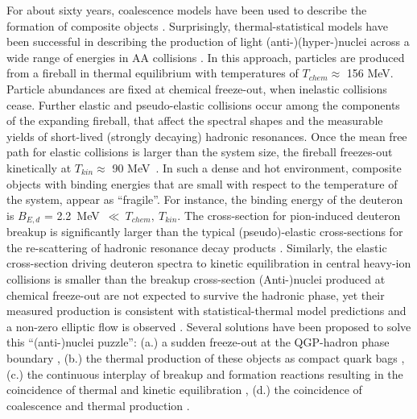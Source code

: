 \documentclass[%
 reprint,
 amsmath,amssymb,
 aps,
]{revtex4-1}
\begin{document}
For about sixty years, coalescence models have been used to describe the formation of composite objects \cite{Butler:1963, Kapusta:1980, Sato:1981ez, Nagle:1996vp, Scheibl:1998tk, Cho:2017dcy, Blum:2017qnn, Bazak:2018hgl, Zhao:2018lyf}.
Surprisingly, thermal-statistical models have been successful in describing the production of light \mbox{(anti-)}(hyper-)nuclei across a wide range of energies in AA collisions \cite{Andronic:2010qu,Andronic:2017}. 
In this approach, particles are produced from a fireball in thermal equilibrium with temperatures of $T_{chem} \approx$ 156 MeV.
Particle abundances are fixed at chemical freeze-out, when inelastic collisions cease. Further elastic and pseudo-elastic collisions occur among the components of the expanding fireball, that affect the spectral shapes and the measurable yields of short-lived (strongly decaying) hadronic resonances. 
Once the mean free path for elastic collisions is larger than the system size, the fireball freezes-out kinetically at $T_{kin} \approx$ 90 MeV~\cite{Abelev:2013vea}. 
In such a dense and hot environment, composite objects with binding energies that are small with respect to the temperature of the system, appear as ``fragile''. 
For instance, the binding energy of the deuteron is $B_{E, d}$ = 2.2~MeV~$\ll~T_{chem},~T_{kin}$.
The cross-section for pion-induced deuteron breakup is significantly larger than the typical (pseudo)-elastic cross-sections for the re-scattering of hadronic resonance decay products \cite{Garcilazo:1982yc, Bass:1998ca, Schukraft:2017nbn, Oliinychenko:2018ugs}. 
Similarly, the elastic cross-section driving deuteron spectra to kinetic equilibration in central heavy-ion collisions \cite{Acharya:2017dmc} is smaller than the breakup cross-section \cite{Garcilazo:1982yc, Bass:1998ca, Schukraft:2017nbn, Oliinychenko:2018ugs}   
(Anti-)nuclei produced at chemical freeze-out are not expected to survive the hadronic phase, yet their measured production is consistent with statistical-thermal model predictions and a non-zero elliptic flow is observed \cite{Acharya:2017dmc, Puccio:2019oyd}. 
Several solutions have been proposed to solve this ``(anti-)nuclei puzzle'': (a.) a sudden freeze-out at the QGP-hadron phase boundary \cite{Castorina:2019pnb}, (b.) the thermal production of these objects as compact quark bags \cite{Andronic:2017}, (c.) the continuous interplay of breakup and formation reactions resulting in the coincidence of thermal and kinetic equilibration \cite{Oliinychenko:2018ugs, Xu:2018jff}, (d.) the coincidence of coalescence and thermal production \cite{Scheibl:1998tk, HeinzTorino}.
\end{document}
